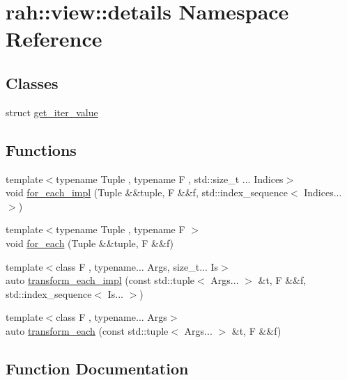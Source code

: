 \hypertarget{namespacerah_1_1view_1_1details}{}\section{rah\+::view\+::details Namespace Reference}
\label{namespacerah_1_1view_1_1details}
\subsection*{Classes}
\begin{DoxyCompactItemize}
\item 
struct \mbox{\hyperlink{structrah_1_1view_1_1details_1_1get__iter__value}{get\+\_\+iter\+\_\+value}}
\end{DoxyCompactItemize}
\subsection*{Functions}
\begin{DoxyCompactItemize}
\item 
{\footnotesize template$<$typename Tuple , typename F , std\+::size\+\_\+t ... Indices$>$ }\\void \mbox{\hyperlink{namespacerah_1_1view_1_1details_aaa1e7ec8fee6c6b2109932e61ff87312}{for\+\_\+each\+\_\+impl}} (Tuple \&\&tuple, F \&\&f, std\+::index\+\_\+sequence$<$ Indices... $>$)
\item 
{\footnotesize template$<$typename Tuple , typename F $>$ }\\void \mbox{\hyperlink{namespacerah_1_1view_1_1details_a377847364cb1497602498863a9255b2c}{for\+\_\+each}} (Tuple \&\&tuple, F \&\&f)
\item 
{\footnotesize template$<$class F , typename... Args, size\+\_\+t... Is$>$ }\\auto \mbox{\hyperlink{namespacerah_1_1view_1_1details_aa19b6b37a888a1c2a04e27766baa84cc}{transform\+\_\+each\+\_\+impl}} (const std\+::tuple$<$ Args... $>$ \&t, F \&\&f, std\+::index\+\_\+sequence$<$ Is... $>$)
\item 
{\footnotesize template$<$class F , typename... Args$>$ }\\auto \mbox{\hyperlink{namespacerah_1_1view_1_1details_a805ec7d23709c75de8735c3735d05148}{transform\+\_\+each}} (const std\+::tuple$<$ Args... $>$ \&t, F \&\&f)
\end{DoxyCompactItemize}


\subsection{Function Documentation}
\mbox{\label{namespacerah_1_1view_1_1details_a377847364cb1497602498863a9255b2c}} 
